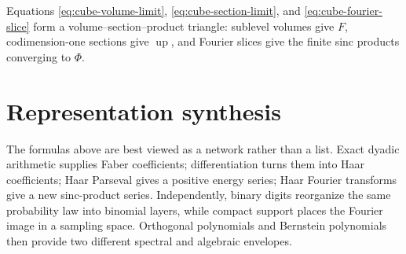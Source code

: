 \documentclass[11pt,oneside]{article}
\theoremstyle{definition}
\theoremstyle{remark}
\newcommand{\Up}{\operatorname{up}}
\newcommand{\1}{\mathbf 1}
\begin{document}
Equations \eqref{eq:cube-volume-limit}, \eqref{eq:cube-section-limit}, and
\eqref{eq:cube-fourier-slice} form a volume--section--product triangle:
sublevel volumes give $F$, codimension-one sections give $\Up$, and Fourier
slices give the finite sinc products converging to $\Phi$.

\section{Representation synthesis}
\label{sec:synthesis}

The formulas above are best viewed as a network rather than a list.  Exact
dyadic arithmetic supplies Faber coefficients; differentiation turns them
into Haar coefficients; Haar Parseval gives a positive energy series; Haar
Fourier transforms give a new sinc-product series.  Independently, binary
digits reorganize the same probability law into binomial layers, while
compact support places the Fourier image in a sampling space.  Orthogonal
polynomials and Bernstein polynomials then provide two different spectral and
algebraic envelopes.
\end{document}
